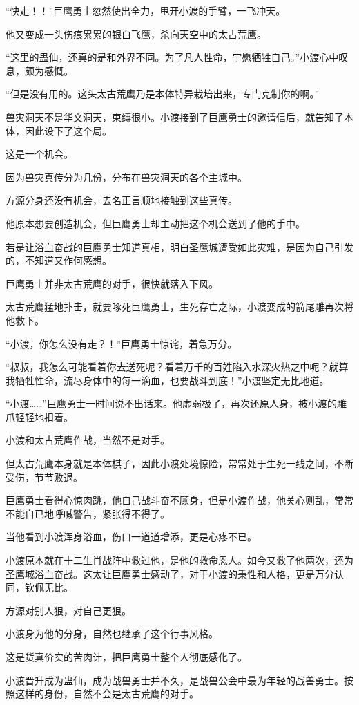 \begin{this_body}
“快走！！”巨鹰勇士忽然使出全力，甩开小渡的手臂，一飞冲天。

他又变成一头伤痕累累的银白飞鹰，杀向天空中的太古荒鹰。

“这里的蛊仙，还真的是和外界不同。为了凡人性命，宁愿牺牲自己。”小渡心中叹息，颇为感慨。

“但是没有用的。这头太古荒鹰乃是本体特异栽培出来，专门克制你的啊。”

兽灾洞天不是华文洞天，束缚很小。小渡接到了巨鹰勇士的邀请信后，就告知了本体，因此设下了这个局。

这是一个机会。

因为兽灾真传分为几份，分布在兽灾洞天的各个主城中。

方源分身还没有机会，去名正言顺地接触到这些真传。

他原本想要创造机会，但巨鹰勇士却主动把这个机会送到了他的手中。

若是让浴血奋战的巨鹰勇士知道真相，明白圣鹰城遭受如此灾难，是因为自己引发的，不知道又作何感想。

巨鹰勇士并非太古荒鹰的对手，很快就落入下风。

太古荒鹰猛地扑击，就要啄死巨鹰勇士，生死存亡之际，小渡变成的箭尾雕再次将他救下。

“小渡，你怎么没有走？！”巨鹰勇士惊诧，着急万分。

“叔叔，我怎么可能看着你去送死呢？看着万千的百姓陷入水深火热之中呢？就算我牺牲性命，流尽身体中的每一滴血，也要战斗到底！”小渡坚定无比地道。

“小渡……”巨鹰勇士一时间说不出话来。他虚弱极了，再次还原人身，被小渡的雕爪轻轻地扣着。

小渡和太古荒鹰作战，当然不是对手。

但太古荒鹰本身就是本体棋子，因此小渡处境惊险，常常处于生死一线之间，不断受伤，节节败退。

巨鹰勇士看得心惊肉跳，他自己战斗奋不顾身，但是小渡作战，他关心则乱，常常不能自已地呼喊警告，紧张得不得了。

当他看到小渡浑身浴血，伤口一道道增添，更是心疼不已。

小渡原本就在十二生肖战阵中救过他，是他的救命恩人。如今又救了他两次，还为圣鹰城浴血奋战。这太让巨鹰勇士感动了，对于小渡的秉性和人格，更是万分认同，钦佩无比。

方源对别人狠，对自己更狠。

小渡身为他的分身，自然也继承了这个行事风格。

这是货真价实的苦肉计，把巨鹰勇士整个人彻底感化了。

小渡晋升成为蛊仙，成为战兽勇士并不久，是战兽公会中最为年轻的战兽勇士。按照这样的身份，自然不会是太古荒鹰的对手。


\end{this_body}
